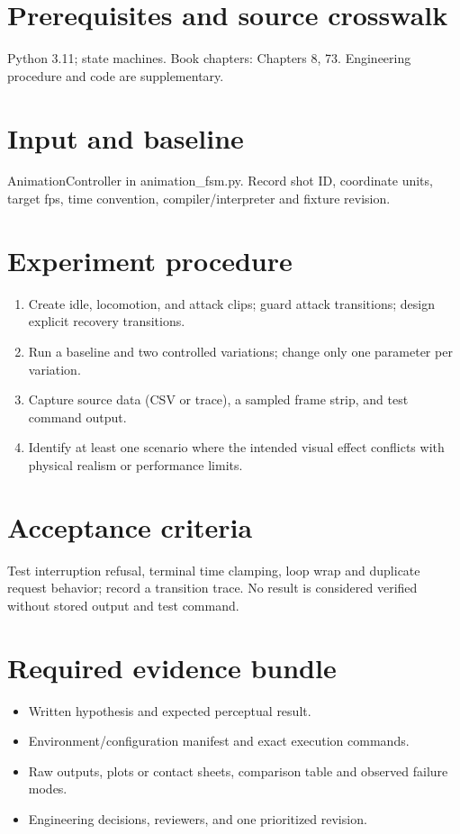 \documentclass[10pt,letterpaper]{article}
\begin{document}
\makedoctitle
\makedocsummary

\section{Prerequisites and source crosswalk}
Python 3.11; state machines. Book chapters: Chapters 8, 73. Engineering procedure and code are supplementary.
\section{Input and baseline}
AnimationController in animation\_fsm.py. Record shot ID, coordinate units, target fps, time convention, compiler/interpreter and fixture revision.
\section{Experiment procedure}
\begin{enumerate}
\item Create idle, locomotion, and attack clips; guard attack transitions; design explicit recovery transitions.
\item Run a baseline and two controlled variations; change only one parameter per variation.
\item Capture source data (CSV or trace), a sampled frame strip, and test command output.
\item Identify at least one scenario where the intended visual effect conflicts with physical realism or performance limits.
\end{enumerate}
\section{Acceptance criteria}
Test interruption refusal, terminal time clamping, loop wrap and duplicate request behavior; record a transition trace. No result is considered verified without stored output and test command.
\section{Required evidence bundle}
\begin{itemize}
\item Written hypothesis and expected perceptual result.
\item Environment/configuration manifest and exact execution commands.
\item Raw outputs, plots or contact sheets, comparison table and observed failure modes.
\item Engineering decisions, reviewers, and one prioritized revision.
\end{itemize}
\end{document}
